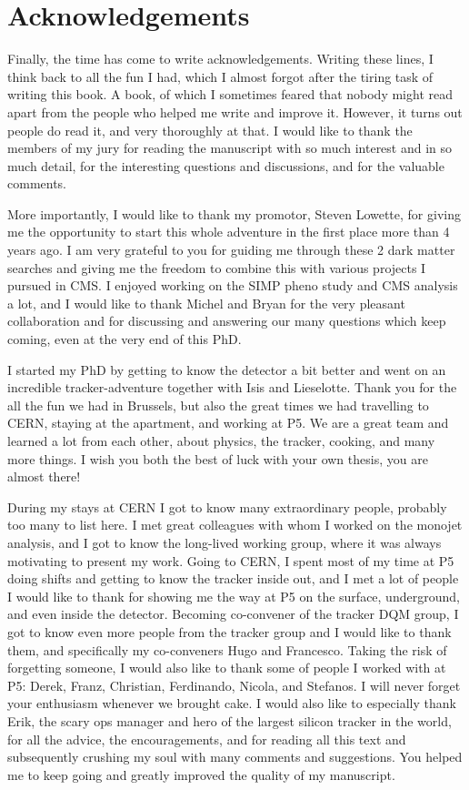\chapter*{Acknowledgements}

Finally, the time has come to write acknowledgements. Writing these lines, I think back to all the fun I had, which I almost forgot after the tiring task of writing this book. A book, of which I sometimes feared that nobody might read apart from the people who helped me write and improve it. However, it turns out people do read it, and very thoroughly at that. I would like to thank the members of my jury for reading the manuscript with so much interest and in so much detail, for the interesting questions and discussions, and for the valuable comments.

More importantly, I would like to thank my promotor, Steven Lowette, for giving me the opportunity to start this whole adventure in the first place more than 4 years ago. I am very grateful to you for guiding me through these 2 dark matter searches and giving me the freedom to combine this with various projects I pursued in CMS. I enjoyed working on the SIMP pheno study and CMS analysis a lot, and I would like to thank Michel and Bryan for the very pleasant collaboration and for discussing and answering our many questions which keep coming, even at the very end of this PhD.

I started my PhD by getting to know the detector a bit better and went on an incredible tracker-adventure together with Isis and Lieselotte. Thank you for the all the fun we had in Brussels, but also the great times we had travelling to CERN, staying at the apartment, and working at P5. We are a great team and learned a lot from each other, about physics, the tracker, cooking, and many more things. I wish you both the best of luck with your own thesis, you are almost there!

During my stays at CERN I got to know many extraordinary people, probably too many to list here. I met great colleagues with whom I worked on the monojet analysis, and I got to know the long-lived working group, where it was always motivating to present my work. Going to CERN, I spent most of my time at P5 doing shifts and getting to know the tracker inside out, and I met a lot of people I would like to thank for showing me the way at P5 on the surface, underground, and even inside the detector. Becoming co-convener of the tracker DQM group, I got to know even more people from the tracker group and I would like to thank them, and specifically my co-conveners Hugo and Francesco. Taking the risk of forgetting someone, I would also like to thank some of people I worked with at P5: Derek, Franz, Christian, Ferdinando, Nicola, and Stefanos. I will never forget your enthusiasm whenever we brought cake. I would also like to especially thank Erik, the scary ops manager and hero of the largest silicon tracker in the world, for all the advice, the encouragements, and for reading all this text and subsequently crushing my soul with many comments and suggestions. You helped me to keep going and greatly improved the quality of my manuscript.

